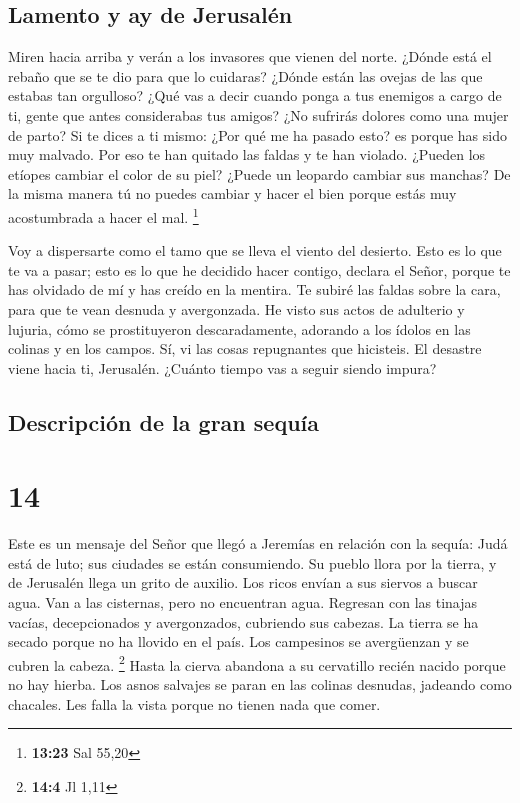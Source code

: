 \hypertarget{lamento-y-ay-de-jerusaluxe9n}{%
\subsection{Lamento y ay de
Jerusalén}\label{lamento-y-ay-de-jerusaluxe9n}}

 Miren hacia arriba y verán a los invasores que vienen
del norte. ¿Dónde está el rebaño que se te dio para que lo cuidaras?
¿Dónde están las ovejas de las que estabas tan orgulloso?
 ¿Qué vas a decir cuando ponga a tus enemigos a cargo de
ti, gente que antes considerabas tus amigos? ¿No sufrirás dolores como
una mujer de parto?  Si te dices a ti mismo: ¿Por qué me
ha pasado esto? es porque has sido muy malvado. Por eso te han quitado
las faldas y te han violado.  ¿Pueden los etíopes cambiar
el color de su piel? ¿Puede un leopardo cambiar sus manchas? De la misma
manera tú no puedes cambiar y hacer el bien porque estás muy
acostumbrada a hacer el mal. \footnote{\textbf{13:23} Sal 55,20}

 Voy a dispersarte como el tamo que se lleva el viento
del desierto.  Esto es lo que te va a pasar; esto es lo
que he decidido hacer contigo, declara el Señor, porque te has olvidado
de mí y has creído en la mentira.  Te subiré las faldas
sobre la cara, para que te vean desnuda y avergonzada. 
He visto sus actos de adulterio y lujuria, cómo se prostituyeron
descaradamente, adorando a los ídolos en las colinas y en los campos.
Sí, vi las cosas repugnantes que hicisteis. El desastre viene hacia ti,
Jerusalén. ¿Cuánto tiempo vas a seguir siendo impura?

\hypertarget{descripciuxf3n-de-la-gran-sequuxeda}{%
\subsection{Descripción de la gran
sequía}\label{descripciuxf3n-de-la-gran-sequuxeda}}

\hypertarget{section-13}{%
\section{14}\label{section-13}}

 Este es un mensaje del Señor que llegó a Jeremías en
relación con la sequía:  Judá está de luto; sus ciudades
se están consumiendo. Su pueblo llora por la tierra, y de Jerusalén
llega un grito de auxilio.  Los ricos envían a sus siervos
a buscar agua. Van a las cisternas, pero no encuentran agua. Regresan
con las tinajas vacías, decepcionados y avergonzados, cubriendo sus
cabezas.  La tierra se ha secado porque no ha llovido en
el país. Los campesinos se avergüenzan y se cubren la cabeza.
\footnote{\textbf{14:4} Jl 1,11}  Hasta la cierva abandona
a su cervatillo recién nacido porque no hay hierba.  Los
asnos salvajes se paran en las colinas desnudas, jadeando como chacales.
Les falla la vista porque no tienen nada que comer.

